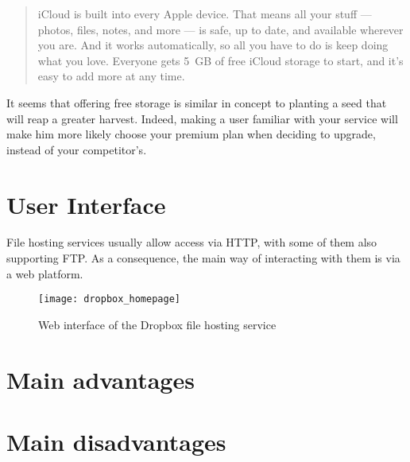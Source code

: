 \begin{quote}
iCloud is built into every Apple device. That means all your stuff — photos, files, notes, and more — is safe, up to date, and available wherever you are. And it works automatically, so all you have to do is keep doing what you love. Everyone gets \mbox{5 GB} of free iCloud storage to start, and it’s easy to add more at any time.
\end{quote}

It seems that offering free storage is similar in concept to planting a seed that will reap a greater harvest. Indeed, making a user familiar with your service will make him more likely choose your premium plan when deciding to upgrade, instead of your competitor's.


\section{User Interface}

File hosting services usually allow access via \mbox{HTTP}, with some of them also supporting \mbox{FTP}. As a consequence, the main way of interacting with them is via a web platform.

\begin{figure}[h]
\caption{Web interface of the Dropbox file hosting service}
\centering
\texttt{[image: dropbox\_homepage]}
\end{figure}

\section {Main advantages}

\section {Main disadvantages}

